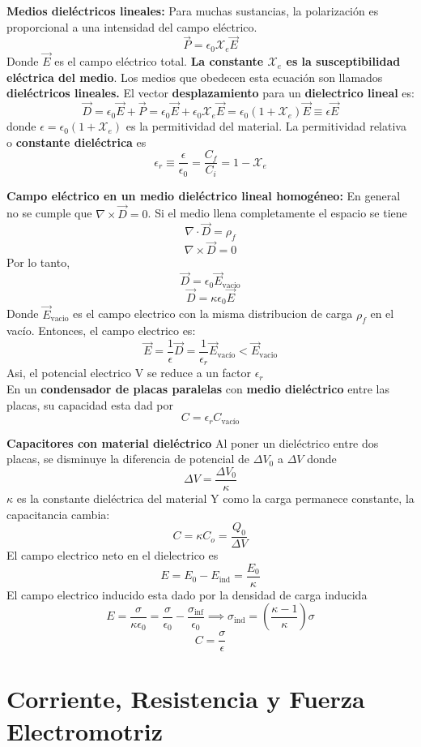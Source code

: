 \documentclass[a4paper, 10pt]{article}
\begin{document}
\begin{multicols*}{2}
	\textbf{Medios dieléctricos lineales: }Para muchas sustancias, la polarización es proporcional a una intensidad del campo eléctrico.
	$$\vec{P} = \epsilon_0 \mathcal{X}_e \vec{E}$$
	Donde $\vec{E}$ es el campo eléctrico total. \textbf{La constante $\mathcal{X}_e$ es la susceptibilidad eléctrica del medio}.
	Los medios que obedecen esta ecuación son llamados \textbf{dieléctricos lineales.}
	El vector \textbf{desplazamiento} para un \textbf{dielectrico lineal} es:
	$$\vec{D}= \epsilon_0\vec{E}+ \vec{P} = \epsilon_0\vec{E}+ \epsilon_0\mathcal{X}_e\vec{E}= \epsilon_0(1+\mathcal{X}_e)\vec{E}\equiv \epsilon\vec{E}$$
	donde $\epsilon =\epsilon_0(1+\mathcal{X}_e)$ es la permitividad del material.
	La permitividad relativa o \textbf{constante dieléctrica} es
	$$\epsilon_r \equiv \frac{\epsilon}{\epsilon_0}= \frac{C_f}{C_i} = 1 -\mathcal{X}_e$$
	     
	\textbf{Campo eléctrico en un medio dieléctrico lineal homogéneo: }En general no se cumple que $\nabla \times \vec{D}=0$. Si el medio llena completamente el espacio se tiene $$\nabla \cdot \vec{D}=\rho _f$$
	$$\nabla \times \vec{D}=0$$
	Por lo tanto, 
	$$\vec{D}= \epsilon_0 \vec{E}_{\text{vacio}}$$
	$$\vec{D}=\kappa \epsilon_0 \vec{E}$$
	Donde $\vec{E}_{\text{vacio}}$ es el campo electrico con la misma distribucion de carga $\rho_f$ en el vacío.
	Entonces, el campo electrico es:
	$$\vec{E}= \frac{1}{\epsilon}\vec{D}= \frac{1}{\epsilon_r}\vec{E}_{\text{vacío}} < \vec{E}_{\text{vacio}}$$
	Asi, el potencial electrico V se reduce a un factor $\epsilon_r$\\
	En un \textbf{condensador de placas paralelas } con \textbf{medio dieléctrico} entre las placas, su capacidad esta dad por $$C = \epsilon _r C_{\text{vacío}}$$
	    
	\textbf{Capacitores con material dieléctrico}
	Al poner un dieléctrico entre dos placas, se disminuye la diferencia de potencial de $\Delta V_0$ a $\Delta V$ donde
	$$\Delta V = \frac{\Delta V_0}{\kappa}$$
	$\kappa$ es la constante dieléctrica del material
	Y como la carga permanece constante, la capacitancia cambia:
	$$C = \kappa C_o = \frac{Q_0}{\Delta V}$$
	El campo electrico neto en el dielectrico es
	$$E= E_0 -  E_{\text{ind}} = \frac{E_0}{\kappa}$$
	El campo electrico inducido esta dado por la densidad de carga inducida
	$$E=\frac{\sigma}{\kappa \epsilon_0}= \frac{\sigma}{\epsilon_0}- \frac{\sigma_{\text{inf}}}{\epsilon_0} \implies \sigma_{\text{ind}} = (\frac{\kappa -1}{\kappa})\sigma$$
	$$C = \frac{\sigma}{\epsilon}$$
	    
	\section{Corriente, Resistencia y Fuerza Electromotriz}

\end{multicols*}
\end{document}
